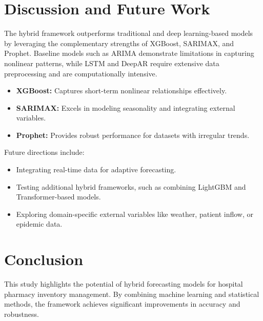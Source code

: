 \documentclass[conference]{IEEEtran}
\begin{document}
\section{Discussion and Future Work}
The hybrid framework outperforms traditional and deep learning-based models by leveraging the complementary strengths of XGBoost, SARIMAX, and Prophet. Baseline models such as ARIMA demonstrate limitations in capturing nonlinear patterns, while LSTM and DeepAR require extensive data preprocessing and are computationally intensive.
\begin{itemize}
    \item \textbf{XGBoost:} Captures short-term nonlinear relationships effectively.
    \item \textbf{SARIMAX:} Excels in modeling seasonality and integrating external variables.
    \item \textbf{Prophet:} Provides robust performance for datasets with irregular trends.
\end{itemize}

Future directions include:
\begin{itemize}
    \item Integrating real-time data for adaptive forecasting.
    \item Testing additional hybrid frameworks, such as combining LightGBM and Transformer-based models.
    \item Exploring domain-specific external variables like weather, patient inflow, or epidemic data.
\end{itemize}

\section{Conclusion}
This study highlights the potential of hybrid forecasting models for hospital pharmacy inventory management. By combining machine learning and statistical methods, the framework achieves significant improvements in accuracy and robustness.



\end{document}
